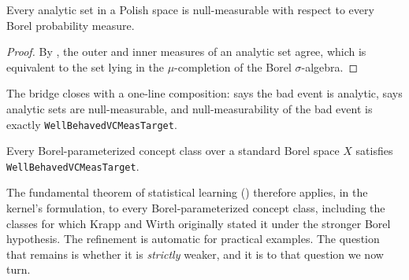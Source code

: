 \begin{cor}
\label{cor:analytic-null-measurable}
  \leanok
Every analytic set in a Polish space is null-measurable with respect
to every Borel probability measure.
\end{cor}

\begin{proof}
By , the outer and inner measures of an
analytic set agree, which is equivalent to the set lying in the
$\mu$-completion of the Borel $\sigma$-algebra.
\end{proof}

The bridge closes with a one-line composition:
 says the bad event is analytic,
 says analytic sets are
null-measurable, and null-measurability of the bad event is exactly
\texttt{WellBehavedVCMeasTarget}.

\begin{prop}
\label{prop:borel-param-implies-wbvc}
  \leanok
Every Borel-parameterized concept class over a standard Borel space
$X$ satisfies \texttt{WellBehavedVCMeasTarget}.
\end{prop}

The fundamental theorem of statistical learning ()
therefore applies, in the kernel's formulation, to every
Borel-parameterized concept class, including the classes for which
Krapp and Wirth originally stated it under the stronger Borel
hypothesis. The refinement is automatic for practical examples. The
question that remains is whether it is \emph{strictly} weaker, and it
is to that question we now turn.


